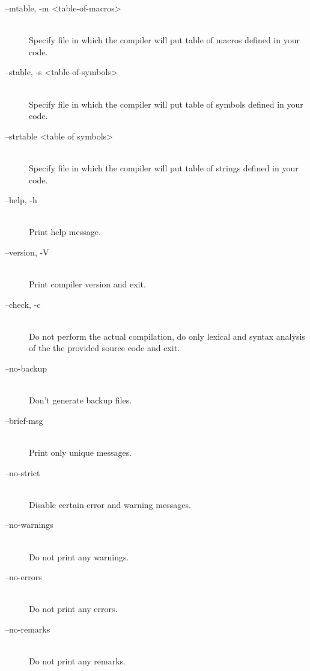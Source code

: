 \begin{description}
            \item[--mtable, -m <table-of-macros>]~\\
                Specify file in which the compiler will put table of macros defined in your code.

            \item[--stable, -s <table-of-symbols>]~\\
                Specify file in which the compiler will put table of symbols defined in your code.

            \item[--strtable <table of symbols>]~\\
                Specify file in which the compiler will put table of strings defined in your code.

            \item[--help, -h]~\\
                Print help message.

            \item[--version, -V]~\\
                Print compiler version and exit.

            \item[--check, -c]~\\
                Do not perform the actual compilation, do only lexical and syntax analysis of the the provided source code and exit.

            \item[--no-backup]~\\
                Don't generate backup files.

            \item[--brief-msg]~\\
                Print only unique messages.

            \item[--no-strict]~\\
                Disable certain error and warning messages.

            \item[--no-warnings]~\\
                Do not print any warnings.

            \item[--no-errors]~\\
                Do not print any errors.

            \item[--no-remarks]~\\
                Do not print any remarks.


\end{description}
